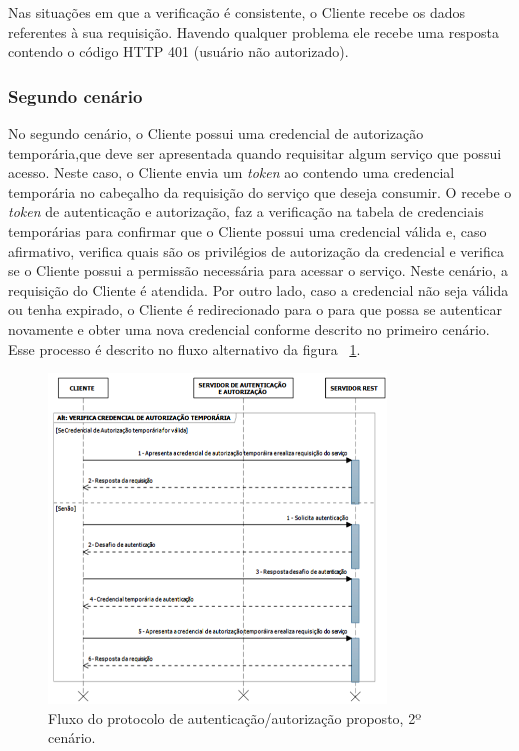 Nas situações em que a verificação é consistente, o Cliente recebe os dados referentes à sua requisição.
Havendo qualquer problema ele recebe uma resposta contendo o código HTTP 401 (usuário não autorizado).


\subsubsection{Segundo cenário}

No segundo cenário, o Cliente possui uma credencial de autorização temporária,que deve ser apresentada quando requisitar algum serviço que possui acesso.
Neste caso, o Cliente envia um \emph{token} ao \servidorRest{} contendo uma credencial temporária no cabeçalho da requisição do serviço que deseja consumir. O \servidorRest recebe o \emph{token} de autenticação e autorização, faz a verificação na tabela de credenciais temporárias para confirmar que o Cliente possui uma credencial válida e, caso afirmativo, verifica quais são os privilégios de autorização da credencial e verifica se o Cliente possui a permissão necessária para acessar o serviço. Neste cenário, a requisição do Cliente é atendida. Por outro lado, caso a credencial não seja válida ou tenha expirado, o Cliente é redirecionado para o \servidorAA{} para que possa se autenticar novamente e obter uma nova credencial conforme descrito no primeiro cenário. Esse processo é descrito no fluxo alternativo da figura ~\ref{fig:cenario2}.

\begin{figure}[!htb]
    \centering
     \includegraphics[width=0.8\textwidth]{cenario2_autenticacao.png}
     \caption{Fluxo do protocolo de autenticação/autorização proposto, 2º cenário.}
     \label{fig:cenario2}
\end{figure}


